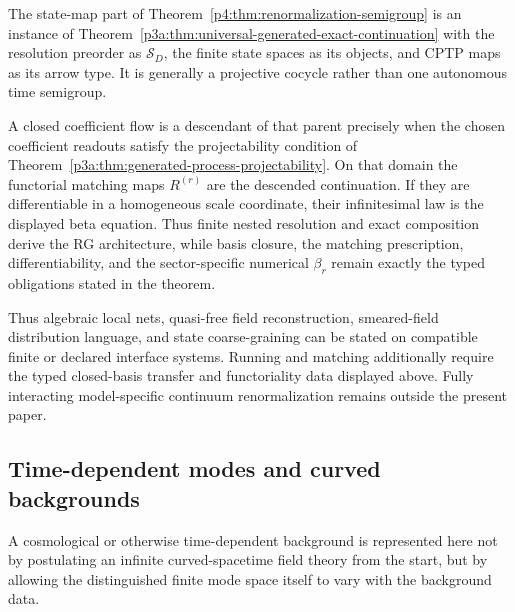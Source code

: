 \documentclass[12pt,a4paper]{article}
\begin{document}
\begin{corollary}
\label{p4:cor:rg-universal-continuation-instance}
The state-map part of
Theorem~\ref{p4:thm:renormalization-semigroup} is an instance of
Theorem~\ref{p3a:thm:universal-generated-exact-continuation} with the
resolution preorder as \(\mathcal S_D\), the finite state spaces as its
objects, and CPTP maps as its arrow type.  It is generally a projective
cocycle rather than one autonomous time semigroup.

A closed coefficient flow is a descendant of that parent precisely when the
chosen coefficient readouts satisfy the projectability condition of
Theorem~\ref{p3a:thm:generated-process-projectability}.  On that domain the
functorial matching maps \(R^{(r)}\) are the descended continuation.  If they
are differentiable in a homogeneous scale coordinate, their infinitesimal
law is the displayed beta equation.  Thus finite nested resolution and exact
composition derive the RG architecture, while basis closure, the matching
prescription, differentiability, and the sector-specific numerical
\(\beta_r\) remain exactly the typed obligations stated in the theorem.
\end{corollary}

Thus algebraic local nets, quasi-free field reconstruction, smeared-field
distribution language, and state coarse-graining can be stated on
compatible finite or declared interface systems.  Running and matching
additionally require the typed closed-basis transfer and functoriality data
displayed above.  Fully interacting model-specific continuum
renormalization remains outside the present paper.



\subsection[Time-dependent mode spaces and curved-background bridge]
{Time-dependent modes and curved backgrounds}
\label{p4:sec:part2-curved-bridge}

A cosmological or otherwise time-dependent background is represented here not by postulating an infinite curved-spacetime field theory from the start, but by allowing the distinguished finite mode space itself to vary with the background data.
\end{document}
